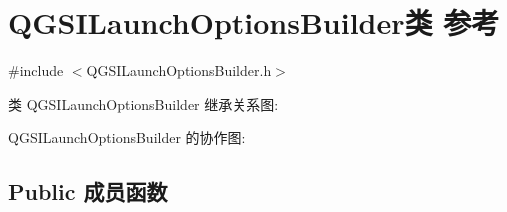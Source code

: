\hypertarget{class_q_g_s_i_launch_options_builder}{}\section{Q\+G\+S\+I\+Launch\+Options\+Builder类 参考}
\label{class_q_g_s_i_launch_options_builder}


{\ttfamily \#include $<$Q\+G\+S\+I\+Launch\+Options\+Builder.\+h$>$}



类 Q\+G\+S\+I\+Launch\+Options\+Builder 继承关系图\+:


Q\+G\+S\+I\+Launch\+Options\+Builder 的协作图\+:
\subsection*{Public 成员函数}
